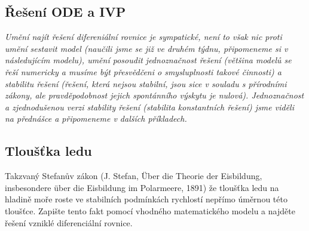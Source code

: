 \stranka

\subsection{Řešení ODE a IVP} 


\textit{Umění najít řešení difereniální rovnice je sympatické, není to však nic proti umění sestavit model (naučili jsme se již ve druhém týdnu, připomeneme si v následujícím modelu), umění posoudit jednoznačnost řešení (většina modelů se řeší numericky a musíme být přesvědčeni o smysluplnosti takové činnosti) a  stabilitu řešení (řešení, která nejsou stabilní, jsou sice v souladu s přírodními zákony, ale pravděpodobnost jejich spontánního výskytu je nulová). Jednoznačnost a zjednodušenou verzi stability řešení (stabilita konstantních řešení) jsme viděli na přednášce a připomeneme v dalších příkladech.}

\stranka

\subsection{Tloušťka ledu}

Takzvaný Stefanův zákon (J. Stefan, \"Uber die Theorie der Eisbildung, insbesondere \"uber die Eisbildung im Polarmeere, 1891) že tloušťka ledu na hladině moře roste ve
stabilních podmínkách rychlostí nepřímo úměrnou této tloušťce. Zapište
tento fakt pomocí vhodného matematického modelu a najděte řešení
vzniklé diferenciální rovnice.



